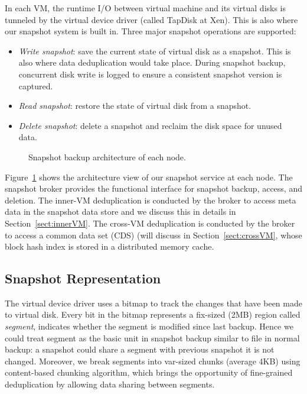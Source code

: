 In each VM, 
the runtime I/O between virtual machine and its virtual
disks is tunneled by the virtual device driver (called TapDisk\cite{Warfield2005} at Xen).
This is also where our snapshot system is built in. Three major snapshot operations are supported:
\begin{itemize}
\item \textit{Write snapshot}: save the current state of virtual disk as a snapshot.
This is also where data deduplication would take place.
During snapshot backup, concurrent disk write is logged 
to ensure a consistent snapshot version is captured. 
\item \textit{Read snapshot}: restore the state of virtual disk from a snapshot.
\item \textit{Delete snapshot}: delete a snapshot and reclaim the disk space for unused data.
\end{itemize}

\begin{figure}[htbp]
  \centering
  \caption{Snapshot backup architecture of each node.}
  \label{fig:arch}
\end{figure}

Figure~\ref{fig:arch} shows the architecture view of our snapshot service
at each node. The snapshot broker provides the functional interface for  snapshot backup, access, and deletion.
The inner-VM  deduplication is conducted by the broker to access meta data in the snapshot data store
and we discuss this in details in Section~\ref{sect:innerVM}.
The cross-VM deduplication is conducted by the broker to access 
a common data set (CDS) (will discuss in Section~\ref{sect:crossVM},
whose block hash index is stored in a distributed memory cache. 

\subsection{Snapshot Representation}
The virtual device driver uses a bitmap to track the changes 
that have been made to virtual disk.
Every bit in the bitmap represents a fix-sized (2MB) region called \textit{segment}, indicates whether the segment
is modified since last backup. Hence we could treat segment as the basic unit in snapshot backup similar to
file in normal backup: a snapshot could share a segment with previous snapshot it is not changed. 
Moreover, we break 
segments into var-sized chunks (average 4KB) using content-based chunking algorithm,
which brings the opportunity of fine-grained deduplication by
allowing data sharing between segments.

